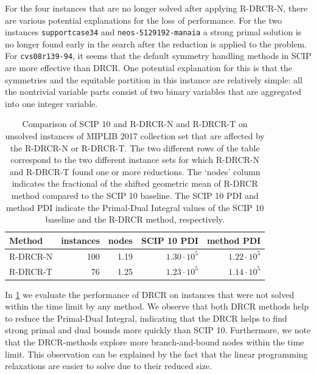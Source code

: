 \documentclass[pdflatex,sn-mathphys-num]{sn-jnl}%
\theoremstyle{thmstyleone}%
\theoremstyle{thmstylethree}%
\theoremstyle{thmstyletwo}%
\begin{document}
For the four instances that are no longer solved after applying R-DRCR-N, there are various potential explanations for the loss of performance. For the two instances \texttt{supportcase34} and \texttt{neos-5129192-manaia} a strong primal solution is no longer found early in the search after the reduction is applied to the problem. For \texttt{cvs08r139-94}, it seems that the default symmetry handling methods in SCIP are more effective than DRCR. One potential explanation for this is that the symmetries and the equitable partition in this instance are relatively simple: all the nontrivial variable parts consist of two binary variables that are aggregated into one integer variable.

\begin{table}[h]
    \centering
        \caption{Comparison of SCIP 10 and R-DRCR-N and R-DRCR-T on unsolved instances of MIPLIB 2017 collection set that are affected by the R-DRCR-N or R-DRCR-T. The two different rows of the table correspond to the two different instance sets for which R-DRCR-N and R-DRCR-T found one or more reductions. The `nodes' column indicates the fractional of the shifted geometric mean of R-DRCR method compared to the SCIP 10 baseline. The SCIP 10 PDI and method PDI indicate the Primal-Dual Integral values of the SCIP 10 baseline and the R-DRCR method, respectively. }
    \label{tab:PDItable}
    \begin{tabular}{lrrrr}
        \toprule
        Method & instances & nodes & SCIP 10 PDI & method PDI \\
        \midrule
        R-DRCR-N & 100 & 1.19 &$1.30\cdot 10^5$ & $1.22\cdot 10^5$  \\
        R-DRCR-T & 76 & 1.25 & $1.23\cdot 10^5$ & $1.14\cdot 10^5$ \\
        \bottomrule
    \end{tabular}
\end{table}

In \cref{tab:PDItable} we evaluate the performance of DRCR on instances that were not solved within the time limit by any method. We observe that both DRCR methods help to reduce the Primal-Dual Integral, indicating that the DRCR helps to find strong primal and dual bounds more quickly than SCIP 10. Furthermore, we note that the DRCR-methods explore more branch-and-bound nodes within the time limit. This observation can be explained by the fact that the linear programming relaxations are easier to solve due to their reduced size.
\end{document}
